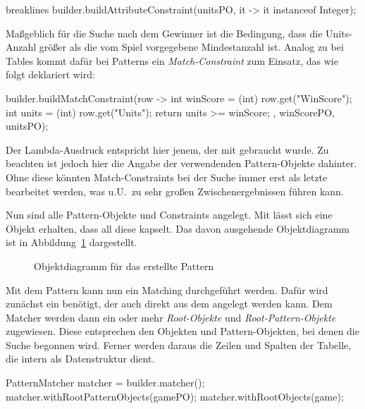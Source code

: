 \begin{jcodeblock*}{breaklines}
    builder.buildAttributeConstraint(unitsPO, it -> it instanceof Integer);
\end{jcodeblock*}

Maßgeblich für die Suche nach dem Gewinner ist die Bedingung, dass die Units-Anzahl größer als die vom Spiel vorgegebene Mindestanzahl ist.
Analog zu  bei Tables kommt dafür bei Patterns ein \emph{Match-Constraint} zum Einsatz,
das wie folgt deklariert wird:

\begin{jcodeblock}
    builder.buildMatchConstraint(row -> {
        int winScore = (int) row.get("WinScore");
        int units = (int) row.get("Units");
        return units >= winScore;
    }, winScorePO, unitsPO);
\end{jcodeblock}

Der Lambda-Ausdruck entspricht hier jenem, der mit  gebraucht wurde.
Zu beachten ist jedoch hier die Angabe der verwendenden Pattern-Objekte dahinter.
Ohne diese könnten Match-Constraints bei der Suche immer erst als letzte bearbeitet werden,
was u.U.\ zu sehr großen Zwischenergebnissen führen kann.

Nun sind alle Pattern-Objekte und Constraints angelegt.
Mit  lässt sich eine Objekt erhalten, dass all diese kapselt.
Das davon ausgehende Objektdiagramm ist in Abbildung~\ref{fig:pattern-diagram} dargestellt.

\begin{figure}
    \caption{Objektdiagramm für das erstellte Pattern}
    \label{fig:pattern-diagram}
\end{figure}

Mit dem Pattern kann nun ein Matching durchgeführt werden.
Dafür wird zunächst ein  benötigt, der auch direkt aus dem  angelegt werden kann.
Dem Matcher werden dann ein oder mehr \emph{Root-Objekte} und \emph{Root-Pattern-Objekte} zugewiesen.
Diese entsprechen den Objekten und Pattern-Objekten, bei denen die Suche begonnen wird.
Ferner werden daraus die Zeilen und Spalten der Tabelle, die intern als Datenstruktur dient.

\begin{jcodeblock}
    PatternMatcher matcher = builder.matcher();
    matcher.withRootPatternObjects(gamePO);
    matcher.withRootObjects(game);
\end{jcodeblock}

